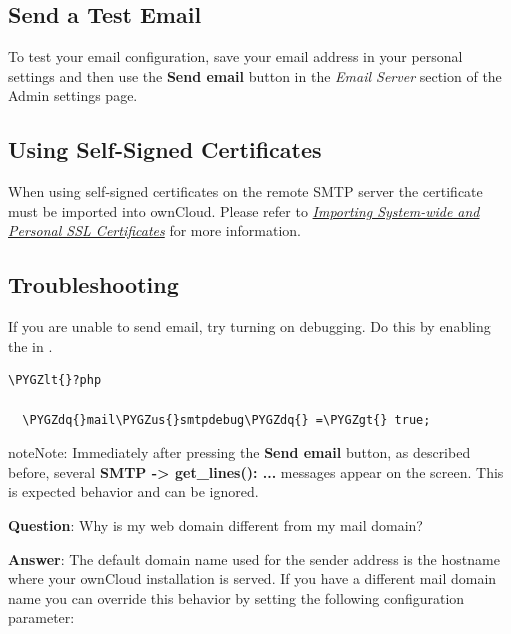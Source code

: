 \documentclass[letterpaper,10pt,english]{sphinxmanual}
\def\PYGZus{\char`\_}
\def\PYGZlt{\char`\<}
\def\PYGZgt{\char`\>}
\def\PYGZdq{\char`\"}
\begin{document}
\subsection{Send a Test Email}
\label{configuration_server/email_configuration:send-a-test-email}
To test your email configuration, save your email address in your personal
settings and then use the \textbf{Send email} button in the \emph{Email Server} section
of the Admin settings page.


\subsection{Using Self-Signed Certificates}
\label{configuration_server/email_configuration:using-self-signed-certificates}
When using self-signed certificates on the remote SMTP server the certificate
must be imported into ownCloud. Please refer to {\hyperref[configuration_server/import_ssl_cert::doc]{\emph{Importing System-wide and Personal SSL Certificates}}} for more information.


\subsection{Troubleshooting}
\label{configuration_server/email_configuration:troubleshooting}
If you are unable to send email, try turning on debugging. Do this by enabling
the  in .

\begin{Verbatim}[commandchars=\\\{\}]
\PYGZlt{}?php

  \PYGZdq{}mail\PYGZus{}smtpdebug\PYGZdq{} =\PYGZgt{} true;
\end{Verbatim}

\begin{notice}{note}{Note:}
Immediately after pressing the \textbf{Send email} button, as described
before, several \textbf{SMTP -\textgreater{} get\_lines(): ...} messages appear on the screen.
This is expected behavior and can be ignored.
\end{notice}

\textbf{Question}: Why is my web domain different from my mail domain?

\textbf{Answer}: The default domain name used for the sender address is the hostname
where your ownCloud installation is served.  If you have a different mail domain
name you can override this behavior by setting the following configuration
parameter:
\end{document}
